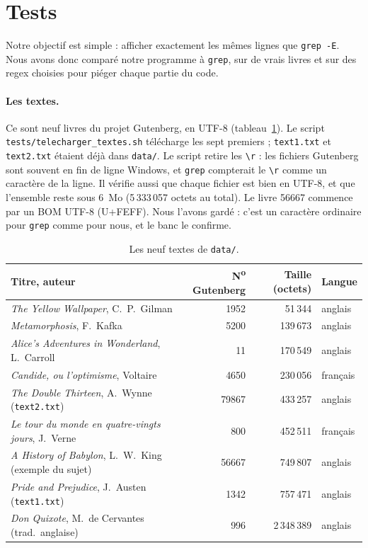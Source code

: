 
\section{Tests}
\label{sec:tests}

Notre objectif est simple : afficher exactement les mêmes lignes que
\texttt{grep -E}. Nous avons donc comparé notre programme à
\texttt{grep}, sur de vrais livres et sur des regex choisies pour piéger
chaque partie du code.

\paragraph{Les textes.}
Ce sont neuf livres du projet Gutenberg, en UTF-8 (tableau~\ref{tab:textes}).
Le script \texttt{tests/telecharger\_textes.sh} télécharge les sept
premiers ; \texttt{text1.txt} et \texttt{text2.txt} étaient déjà dans
\texttt{data/}. Le script retire les \texttt{\textbackslash r} : les
fichiers Gutenberg sont souvent en fin de ligne Windows, et
\texttt{grep} compterait le \texttt{\textbackslash r} comme un caractère
de la ligne. Il vérifie aussi que chaque fichier est bien en UTF-8, et
que l'ensemble reste sous 6~Mo (5\,333\,057 octets au total). Le livre
56667 commence par un BOM UTF-8 (U+FEFF). Nous l'avons gardé : c'est un
caractère ordinaire pour \texttt{grep} comme pour nous, et le banc le
confirme.

\begin{table}[htbp]
\centering
\small
\begin{tabular}{|l|r|r|l|}
\hline
Titre, auteur & N\textsuperscript{o} Gutenberg & Taille (octets) & Langue \\
\hline
\emph{The Yellow Wallpaper}, C.~P.~Gilman & 1952 & 51\,344 & anglais \\
\emph{Metamorphosis}, F.~Kafka & 5200 & 139\,673 & anglais \\
\emph{Alice's Adventures in Wonderland}, L.~Carroll & 11 & 170\,549 & anglais \\
\emph{Candide, ou l'optimisme}, Voltaire & 4650 & 230\,056 & français \\
\emph{The Double Thirteen}, A.~Wynne (\texttt{text2.txt}) & 79867 & 433\,257 & anglais \\
\emph{Le tour du monde en quatre-vingts jours}, J.~Verne & 800 & 452\,511 & français \\
\emph{A History of Babylon}, L.~W.~King (exemple du sujet) & 56667 & 749\,807 & anglais \\
\emph{Pride and Prejudice}, J.~Austen (\texttt{text1.txt}) & 1342 & 757\,471 & anglais \\
\emph{Don Quixote}, M.~de Cervantes (trad.\ anglaise) & 996 & 2\,348\,389 & anglais \\
\hline
\end{tabular}
\caption{Les neuf textes de \texttt{data/}.}
\label{tab:textes}
\end{table}

